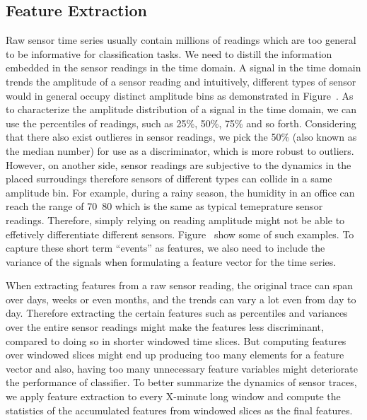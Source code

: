 \subsection{Feature Extraction}
Raw sensor time series usually contain millions of readings which are too general to be informative for classification
tasks. We need to distill the information embedded in the sensor readings in the time domain. A signal in the time domain
trends the amplitude of a sensor reading and intuitively, different types of sensor would in general occupy distinct
amplitude bins as demonstrated in Figure~\cite{}. As to characterize the amplitude distribution of a signal in the time
domain, we can use the percentiles of readings, such as 25\%, 50\%, 75\% and so forth. Considering that there also
exist outlieres in sensor readings, we pick the 50\% (also known as the median number) for use as a discriminator, which
is more robust to outliers. However, on another side, sensor readings are subjective to the dynamics in the placed
surroudings therefore sensors of different types can collide in a same amplitude bin. For example, during a rainy season, the humidity in an
office can reach the range of 70~80 which is the same as typical temeprature sensor readings. Therefore, simply relying
on reading amplitude might not be able to effetively differentiate different sensors. Figure~\cite{} show some of such
examples. To capture these short term ``events'' as features, we also need to include the variance of the signals when
formulating a feature vector for the time series.

When extracting features from a raw sensor reading, the original trace can span over days, weeks or even months, and
the trends can vary a lot even from day to day. Therefore extracting the certain features such as percentiles and
variances over the entire sensor readings might make the features less discriminant, compared to doing so in shorter
windowed time slices. But computing features over windowed slices might end up producing too many elements for a
feature vector and also, having too many unnecessary feature variables might deteriorate the performance of classifier.
To better summarize the dynamics of sensor traces, we apply feature extraction to every X-minute long window and compute
the statistics of the accumulated features from windowed slices as the final features. 

